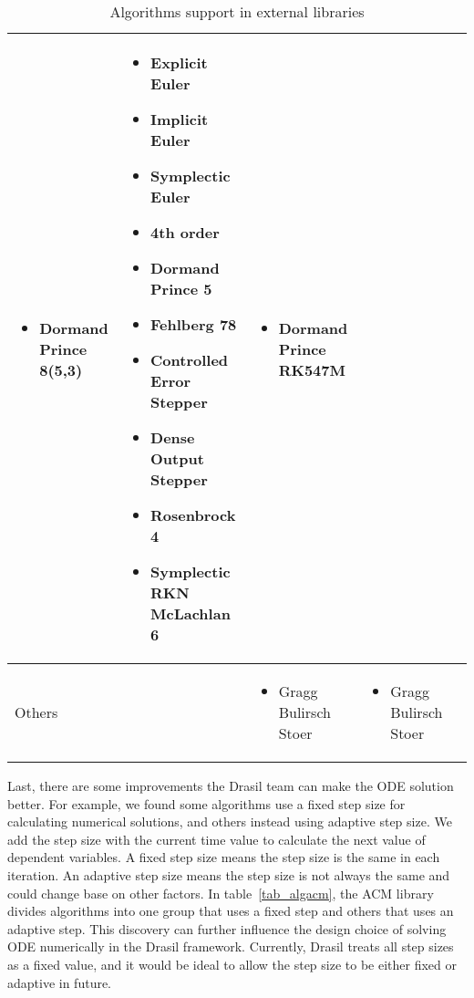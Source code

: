 \begin{sidewaystable}
\begin{adjustbox}{width=\columnwidth,center}
\begin{tabular}{p{} | p{} p{} p{} p{}}
\begin{itemize}[wide]
        \item Dormand Prince 8(5,3) 
        \end{itemize} & 
        \begin{itemize}[wide]
        \item Explicit Euler
        \item Implicit Euler
        \item Symplectic Euler
        \item 4th order
        \item Dormand Prince 5
        \item Fehlberg 78
        \item Controlled Error Stepper
        \item Dense Output Stepper
        \item Rosenbrock 4
        \item Symplectic RKN McLachlan 6
        \end{itemize} & 
        \begin{itemize}[wide]
        \item Dormand Prince RK547M
        \end{itemize} \\ \hline
    Others && 
        \begin{itemize}[wide]
        \item Gragg Bulirsch Stoer 
        \end{itemize} & 
        \begin{itemize}[wide]
        \item Gragg Bulirsch Stoer 
        \end{itemize} &\\
    \bottomrule	
\end{tabular}
\end{adjustbox}
\caption{Algorithms support in external libraries}	
\label{tab_algoexlib}
\end{sidewaystable}

Last, there are some improvements the Drasil team can make the ODE solution better. For example, we found some algorithms use a fixed step size for calculating numerical solutions, and others instead using adaptive step size. We add the step size with the current time value to calculate the next value of dependent variables. A fixed step size means the step size is the same in each iteration. An adaptive step size means the step size is not always the same and could change base on other factors. In table~\ref{tab_algacm}, the ACM library divides algorithms into one group that uses a fixed step and others that uses an adaptive step. This discovery can further influence the design choice of solving ODE numerically in the Drasil framework. Currently, Drasil treats all step sizes as a fixed value, and it would be ideal to allow the step size to be either fixed or adaptive in future.

